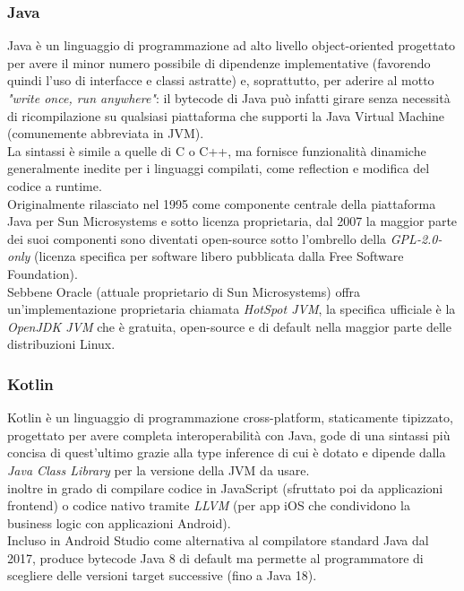 \subsubsection{Java}
Java è un linguaggio di programmazione ad alto livello object-oriented progettato per avere il minor numero possibile di dipendenze implementative (favorendo quindi l'uso di interfacce e classi astratte) e, soprattutto, per aderire al motto \textit{"write once, run anywhere"}: il bytecode di Java può infatti girare senza necessità di ricompilazione su qualsiasi piattaforma che supporti la Java Virtual Machine (comunemente abbreviata in JVM).\\  
La sintassi è simile a quelle di C o C++, ma fornisce funzionalità dinamiche generalmente inedite per i linguaggi compilati, come reflection e modifica del codice a runtime.\\
Originalmente rilasciato nel 1995 come componente centrale della piattaforma Java per Sun Microsystems e sotto licenza proprietaria, dal 2007 la maggior parte dei suoi componenti sono diventati open-source sotto l'ombrello della \textit{GPL-2.0-only} (licenza specifica per software libero pubblicata dalla Free Software Foundation).\\
Sebbene Oracle (attuale proprietario di Sun Microsystems) offra un'implementazione proprietaria chiamata \textit{HotSpot JVM}, la specifica ufficiale è la \textit{OpenJDK JVM} che è gratuita, open-source e di default nella maggior parte delle distribuzioni Linux.

\subsubsection{Kotlin}
Kotlin è un linguaggio di programmazione cross-platform, staticamente tipizzato, progettato per avere completa interoperabilità con Java, gode di una sintassi più concisa di quest'ultimo grazie alla type inference di cui è dotato e dipende dalla \textit{Java Class Library} per la versione della JVM da usare.\\
\E{} inoltre in grado di compilare codice in JavaScript (sfruttato poi da applicazioni frontend) o codice nativo tramite \textit{LLVM} (per app iOS che condividono la business logic con applicazioni Android).\\
Incluso in Android Studio come alternativa al compilatore standard Java dal 2017, produce bytecode Java 8 di default ma permette al programmatore di scegliere delle versioni target successive (fino a Java 18).

